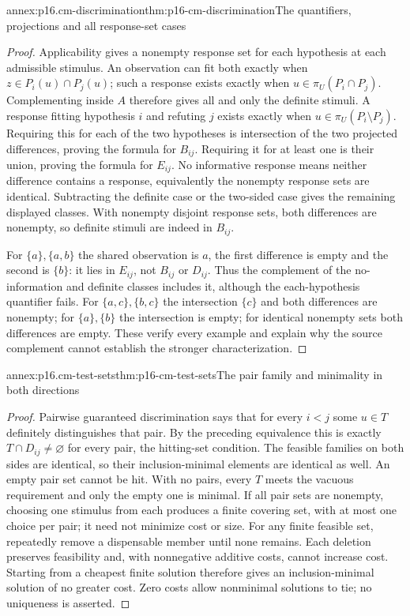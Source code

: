 \begin{annexitem}{annex:p16.cm-discrimination}{thm:p16-cm-discrimination}{The quantifiers, projections and all response-set cases}
\begin{proof}
Applicability gives a nonempty response set for each hypothesis at each
admissible stimulus. An observation can fit both exactly when
\(z\in P_i(u)\cap P_j(u)\); such a response exists exactly when
\(u\in\pi_U(P_i\cap P_j)\). Complementing inside \(A\) therefore
gives all and only the definite stimuli. A response fitting hypothesis
\(i\) and refuting \(j\) exists exactly when
\(u\in\pi_U(P_i\setminus P_j)\). Requiring this for each of the
two hypotheses is intersection of the two projected differences, proving
the formula for \(B_{ij}\). Requiring it for at least one is their union,
proving the formula for \(E_{ij}\). No informative response means neither
difference contains a response, equivalently the nonempty response sets
are identical. Subtracting the definite case or the two-sided case gives
the remaining displayed classes. With nonempty disjoint response sets,
both differences are nonempty, so definite stimuli are indeed in \(B_{ij}\).

For \(\{a\},\{a,b\}\) the shared observation is \(a\), the first
difference is empty and the second is \(\{b\}\): it lies in
\(E_{ij}\), not \(B_{ij}\) or \(D_{ij}\). Thus the complement of
the no-information and definite classes includes it, although the
each-hypothesis quantifier fails. For \(\{a,c\},\{b,c\}\) the
intersection \(\{c\}\) and both differences are nonempty; for
\(\{a\},\{b\}\) the intersection is empty; for identical nonempty
sets both differences are empty. These verify every example and explain
why the source complement cannot establish the stronger characterization.
\end{proof}
\end{annexitem}

\begin{annexitem}{annex:p16.cm-test-sets}{thm:p16-cm-test-sets}{The pair family and minimality in both directions}
\begin{proof}
Pairwise guaranteed discrimination says that for every \(i<j\) some
\(u\in T\) definitely distinguishes that pair. By the preceding
equivalence this is exactly \(T\cap D_{ij}\ne\varnothing\) for
every pair, the hitting-set condition. The feasible families on both sides
are identical, so their inclusion-minimal elements are identical as well.
An empty pair set cannot be hit. With no pairs, every \(T\) meets the
vacuous requirement and only the empty one is minimal. If all pair sets
are nonempty, choosing one stimulus from each produces a finite covering
set, with at most one choice per pair; it need not minimize cost or size.
For any finite feasible set, repeatedly remove a dispensable member until
none remains. Each deletion preserves feasibility and, with nonnegative
additive costs, cannot increase cost. Starting from a cheapest finite
solution therefore gives an inclusion-minimal solution of no greater cost.
Zero costs allow nonminimal solutions to tie; no uniqueness is asserted.
\end{proof}
\end{annexitem}

